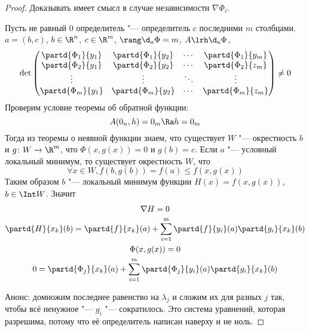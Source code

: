 \begin{proof}
	Доказывать имеет смысл в случае независимости $\nabla \Phi_i$.

	Пусть не равный 0 определитель "--- определитель c последними $m$ столбцами.
	$a = (b, c)$, $b \in \R^n$, $c \in \R^m$, $\rang \d_a \Phi = m$, $A \lrh \d_a \Phi$,
	\[
		\det \begin{pmatrix}
			\partd{\Phi_1}{y_1} & \partd{\Phi_1}{y_2} & \cdots & \partd{\Phi_1}{y_m} \\
			\partd{\Phi_2}{y_1} & \partd{\Phi_2}{y_2} & \cdots & \partd{\Phi_2}{z_m} \\
			\vdots & \vdots & \ddots & \vdots \\
			\partd{\Phi_m}{y_1} & \partd{\Phi_m}{y_2} & \cdots & \partd{\Phi_m}{z_m} \\
		\end{pmatrix} \ne 0
	\]
	Проверим условие теоремы об обратной функции:
	\[ A(0_n, h) = 0_m \Ra h = 0_m \]
	Тогда из теоремы о неявной функции знаем, что существует $W$ "--- окрестность $b$ и
	$g\colon W \to \R^m$, что $\Phi(x, g(x)) = 0$ и $g(b) = c$.
	Если $a$ "--- условный локальный минимум, то существует окрестность $W$, что
	\[ \forall x \in W, f(b, g(b)) = f(a) \le f(x, g(x)) \]
	Таким образом $b$ "--- локальный минимум функции $H(x) = f(x, g(x))$, $b \in \Int W$.
	Значит
	\begin{gather*}
		\nabla H = 0 \\
		\partd{H}{x_k}(b) = \partd{f}{x_k}(a) + \sum_{i=1}^{m} \partd{f}{y_i}(a) \partd{g_i}{x_k}(b) \\
		\Phi(x, g(x)) = 0 \\
		0 = \partd{\Phi_j}{x_k}(a) + \sum_{i=1}^{m} \partd{\Phi_j}{y_i}(a) \partd{g_i}{x_k}(b)
	\end{gather*}

	Анонс: домножим последнее равенство на $\lambda_j$ и сложим их для разных $j$ так,
	чтобы всё ненужное "--- $g_i$ "--- сократилось. Это система уравнений, которая разрешима, потому что её определитель написан наверху и не ноль.
\end{proof}
